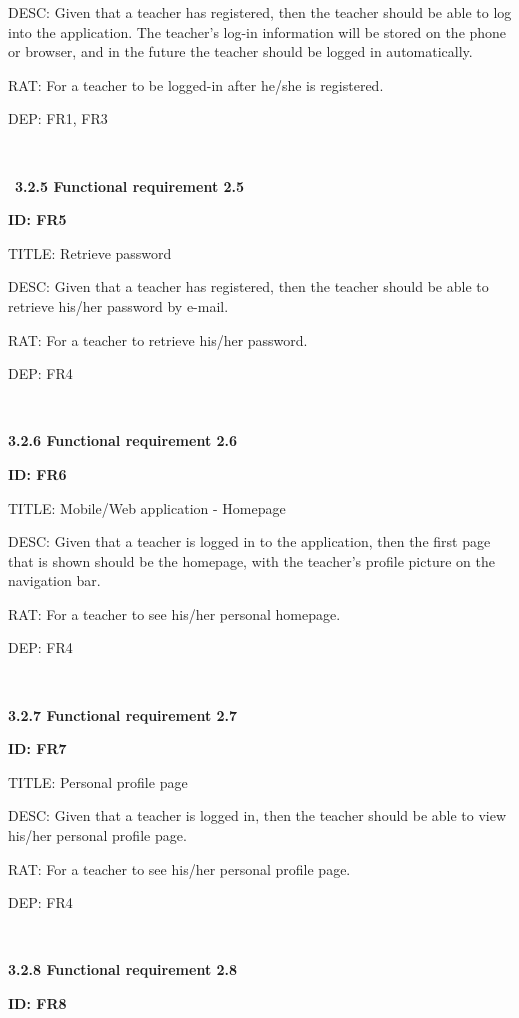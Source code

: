 \documentclass[12pt,a4paper]{article}
\begin{document}
\begin{flushleft}
        DESC: Given that a teacher has registered, then the teacher should be
        able to log into the application. The teacher's log-in information will
        be stored on the phone or browser, and in the future the teacher should
        be logged in automatically.

        RAT: For a teacher to be logged-in after he/she is registered.

        DEP: FR1, FR3

        \

        \
\textbf{3.2.5 Functional requirement 2.5}

        \textbf{ID: FR5}

        TITLE: Retrieve password

        DESC: Given that a teacher has registered, then the teacher should be
        able to retrieve his/her password by e-mail.

        RAT: For a teacher to retrieve his/her password.

        DEP: FR4

        \

        \textbf{3.2.6 Functional requirement 2.6}

        \textbf{ID: FR6}

        TITLE: Mobile/Web application - Homepage

        DESC: Given that a teacher is logged in to the application, then the
        first page that is shown should be the homepage, with the teacher's
        profile picture on the navigation bar.

        RAT: For a teacher to see his/her personal homepage.

        DEP: FR4


        \

        \textbf{3.2.7 Functional requirement 2.7}

        \textbf{ID: FR7}

        TITLE: Personal profile page

        DESC: Given that a teacher is logged in, then the teacher should be able
        to view his/her personal profile page.

        RAT: For a teacher to see his/her personal profile page.

        DEP: FR4

        \

        \textbf{3.2.8 Functional requirement 2.8}

        \textbf{ID: FR8}


\end{flushleft}
\end{document}
